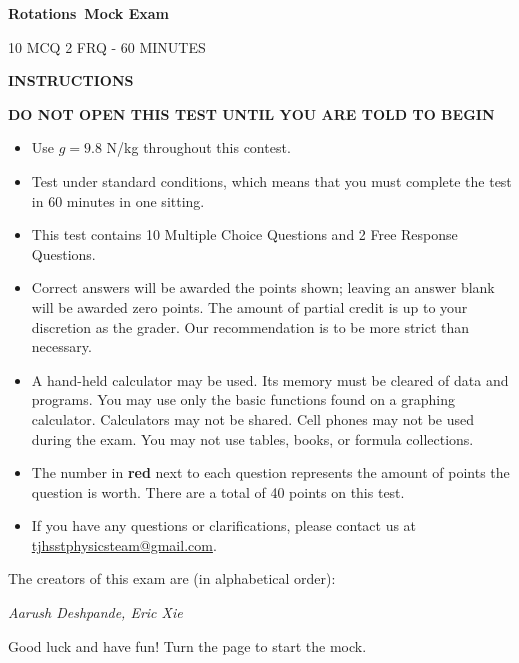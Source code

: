 \documentclass[12pt]{article}
\newcommand{\ptfmt}[1]{\textbf{\color{ptred}#1\color{black}}}
\theoremstyle{mystyle}
\newcommand\mocktitle{Rotations}
\begin{document}
\begin{center}
    \Large \textbf{\mocktitle\ Mock Exam} \vspace{4mm}
    
    \Large 10 MCQ 2 FRQ - 60 MINUTES \vspace{4mm}
    
    \Large \textbf{INSTRUCTIONS} \linebreak[2]
    
    \normalsize \textbf{DO NOT OPEN THIS TEST UNTIL YOU ARE TOLD TO BEGIN}
\end{center}

\begin{itemize}
    \item Use $g = 9.8$ N/kg throughout this contest.
    \item Test under standard conditions, which means that you must complete the test in 60 minutes in one sitting.
    \item This test contains 10 Multiple Choice Questions and 2 Free Response Questions.
    \item Correct answers will be awarded the points shown; leaving an answer blank will be awarded zero points. The amount of partial credit is up to your discretion as the grader. Our recommendation is to be more strict than necessary.
    \item A hand-held calculator may be used. Its memory must be cleared of data and programs. You may use only the basic functions found on a graphing calculator. Calculators may not be shared. Cell phones may not be used during the exam. You may not use tables, books, or formula collections.
    \item The number in \ptfmt{red} next to each question represents the amount of points the question is worth. There are a total of 40 points on this test.
    \item If you have any questions or clarifications, please contact us at \href{mailto:tjhsstphysicsteam@gmail.com}{tjhsstphysicsteam@gmail.com}.
\end{itemize}
\vspace{7mm}

The creators of this exam are (in alphabetical order):
\vspace{1mm}
\begin{center}
    \textit{Aarush Deshpande, Eric Xie}
\end{center}

Good luck and have fun! Turn the page to start the mock.
\end{document}
